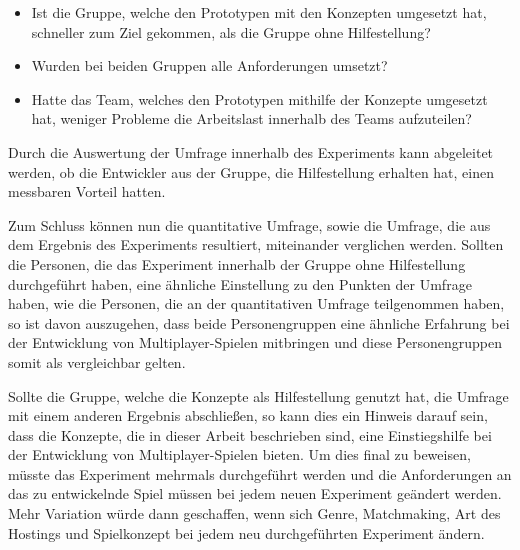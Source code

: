 \begin{itemize}
	\item Ist die Gruppe, welche den Prototypen mit den Konzepten umgesetzt hat, schneller zum Ziel gekommen, als die Gruppe ohne Hilfestellung?
	\item Wurden bei beiden Gruppen alle Anforderungen umsetzt?
	\item Hatte das Team, welches den Prototypen mithilfe der Konzepte umgesetzt hat, weniger Probleme die Arbeitslast innerhalb des Teams aufzuteilen?
\end{itemize}

Durch die Auswertung der Umfrage innerhalb des Experiments kann abgeleitet werden, ob die Entwickler aus der Gruppe, die Hilfestellung erhalten hat, einen messbaren Vorteil hatten.

Zum Schluss können nun die quantitative Umfrage, sowie die Umfrage, die aus dem Ergebnis des Experiments resultiert, miteinander verglichen werden. Sollten die Personen, die das Experiment innerhalb der Gruppe ohne Hilfestellung durchgeführt haben, eine ähnliche Einstellung zu den Punkten der Umfrage haben, wie die Personen, die an der quantitativen Umfrage teilgenommen haben, so ist davon auszugehen, dass beide Personengruppen eine ähnliche Erfahrung bei der Entwicklung von Multiplayer-Spielen mitbringen und diese Personengruppen somit als vergleichbar gelten.

Sollte die Gruppe, welche die Konzepte als Hilfestellung genutzt hat, die Umfrage mit einem anderen Ergebnis abschließen, so kann dies ein Hinweis darauf sein, dass die Konzepte, die in dieser Arbeit beschrieben sind, eine Einstiegshilfe bei der Entwicklung von Multiplayer-Spielen bieten. Um dies final zu beweisen, müsste das Experiment mehrmals durchgeführt werden und die Anforderungen an das zu entwickelnde Spiel müssen bei jedem neuen Experiment geändert werden. Mehr Variation würde dann geschaffen, wenn sich Genre, Matchmaking, Art des Hostings und Spielkonzept bei jedem neu durchgeführten Experiment ändern.